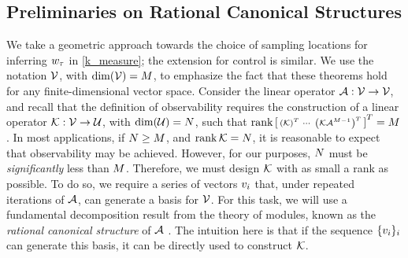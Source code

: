 \subsection{Preliminaries on Rational Canonical Structures}\label{sec_prelim}
We take a geometric approach towards the choice of sampling locations for inferring $w_{\tau}$ in  \eqref{k_measure}; the extension for control is similar.  We use the notation $\mathcal{V}$, with $\operatorname{dim}(\mathcal{V})=M$, to emphasize the fact that these theorems hold for any finite-dimensional vector space. Consider the linear operator $\mathcal{A}:\mathcal{V}\rightarrow\mathcal{V}$, and recall that the definition of observability requires the construction of a linear operator $\mathcal{K}:\mathcal{V}\to\mathcal{U}$, with $\dim(\mathcal{U}) = N$, such that 
$\operatorname{rank}\left[
 \begin{smallmatrix}
  \left(\mathcal{K}\right)^T &
  \cdots &
  \left(\mathcal{K} \mathcal{A}^{M-1}\right)^T
 \end{smallmatrix}
 \right]^T = M$. 
In most applications, if $N\geq M$, and $\operatorname{rank}\mathcal{K} = N$, it is reasonable to expect that observability may be achieved. However, for our purposes, $N$ must be \emph{significantly} less than $M$. Therefore, we must design $\mathcal{K}$ with as small a rank as possible. To do so, we require a series of vectors $v_i$ that, under repeated iterations of $\mathcal{A}$, can generate a basis for $\mathcal{V}$. For this task, we will use a fundamental decomposition result from the theory of modules, known as the \emph{rational canonical structure} of $\mathcal{A}$ \cite{wonham1974linear}. The intuition here is that if the sequence $\{v_i\}_{i}$ can generate this basis, it can be directly used to construct $\mathcal{K}$.

